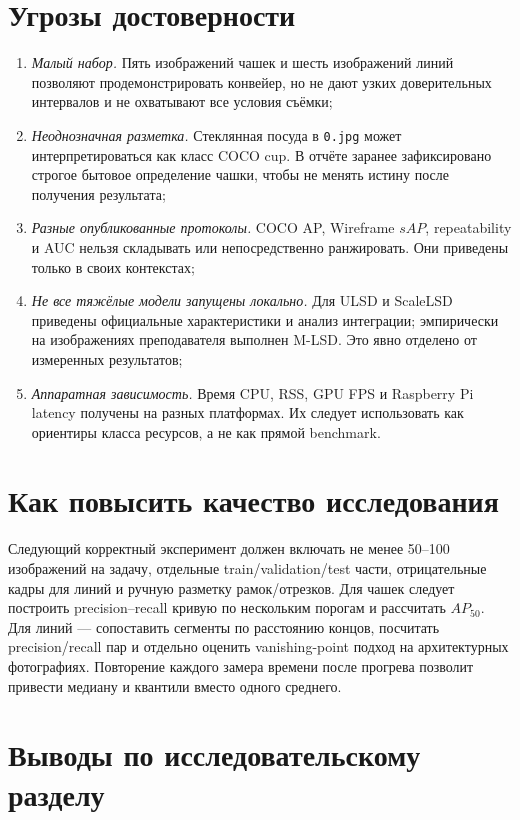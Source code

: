 \documentclass[a4paper,12pt]{extreport}
\newcommand{\code}[1]{\nolinkurl{#1}}
\begin{document}
\section{Угрозы достоверности}

\begin{enumerate}
\item \emph{Малый набор.} Пять изображений чашек и шесть изображений линий позволяют продемонстрировать конвейер, но не дают узких доверительных интервалов и не охватывают все условия съёмки;
\item \emph{Неоднозначная разметка.} Стеклянная посуда в \code{0.jpg} может интерпретироваться как класс COCO cup. В отчёте заранее зафиксировано строгое бытовое определение чашки, чтобы не менять истину после получения результата;
\item \emph{Разные опубликованные протоколы.} COCO AP, Wireframe $sAP$, repeatability и AUC нельзя складывать или непосредственно ранжировать. Они приведены только в своих контекстах;
\item \emph{Не все тяжёлые модели запущены локально.} Для ULSD и ScaleLSD приведены официальные характеристики и анализ интеграции; эмпирически на изображениях преподавателя выполнен M-LSD. Это явно отделено от измеренных результатов;
\item \emph{Аппаратная зависимость.} Время CPU, RSS, GPU FPS и Raspberry Pi latency получены на разных платформах. Их следует использовать как ориентиры класса ресурсов, а не как прямой benchmark.
\end{enumerate}

\section{Как повысить качество исследования}

Следующий корректный эксперимент должен включать не менее 50--100 изображений на задачу, отдельные train/validation/test части, отрицательные кадры для линий и ручную разметку рамок/отрезков. Для чашек следует построить precision--recall кривую по нескольким порогам и рассчитать $AP_{50}$. Для линий --- сопоставить сегменты по расстоянию концов, посчитать precision/recall пар и отдельно оценить vanishing-point подход на архитектурных фотографиях. Повторение каждого замера времени после прогрева позволит привести медиану и квантили вместо одного среднего.

\section{Выводы по исследовательскому разделу}
\end{document}
